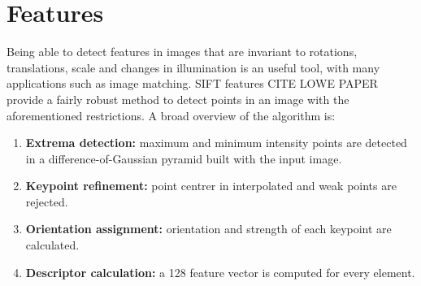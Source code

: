 \documentclass[12pt]{article}
\begin{document}
\section{Features}

Being able to detect features in images that are invariant to rotations, translations, scale and changes in illumination is an useful tool, with many applications such as image matching.
SIFT features CITE LOWE PAPER provide a fairly robust method to detect points in an image with the aforementioned restrictions.
A broad overview of the algorithm is:
\begin{enumerate}
\item \textbf{Extrema detection:} maximum and minimum intensity points are detected in a difference-of-Gaussian pyramid built with the input image.
\item \textbf{Keypoint refinement:} point centrer in interpolated and weak points are rejected.
\item \textbf{Orientation assignment:} orientation and strength of each keypoint are calculated.
\item \textbf{Descriptor calculation:} a 128 feature vector is computed for every element.
\end{enumerate}
\end{document}
